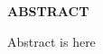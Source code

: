 
\thispagestyle{empty}


\vspace{-4cm}

\begin{center}
 {\large\bf ABSTRACT}
\end{center}


Abstract is here